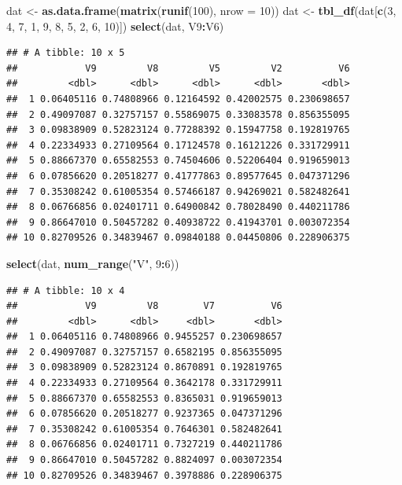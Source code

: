 \documentclass[]{book}
\newenvironment{Shaded}{\begin{snugshade}}{\end{snugshade}}
\newcommand{\KeywordTok}[1]{\textcolor[rgb]{0.13,0.29,0.53}{\textbf{#1}}}
\newcommand{\DataTypeTok}[1]{\textcolor[rgb]{0.13,0.29,0.53}{#1}}
\newcommand{\DecValTok}[1]{\textcolor[rgb]{0.00,0.00,0.81}{#1}}
\newcommand{\StringTok}[1]{\textcolor[rgb]{0.31,0.60,0.02}{#1}}
\newcommand{\OperatorTok}[1]{\textcolor[rgb]{0.81,0.36,0.00}{\textbf{#1}}}
\newcommand{\NormalTok}[1]{#1}
\begin{document}
\begin{Shaded}
\begin{Highlighting}[]
\NormalTok{dat <-}\StringTok{ }\KeywordTok{as.data.frame}\NormalTok{(}\KeywordTok{matrix}\NormalTok{(}\KeywordTok{runif}\NormalTok{(}\DecValTok{100}\NormalTok{), }\DataTypeTok{nrow =} \DecValTok{10}\NormalTok{))}
\NormalTok{dat <-}\StringTok{ }\KeywordTok{tbl_df}\NormalTok{(dat[}\KeywordTok{c}\NormalTok{(}\DecValTok{3}\NormalTok{, }\DecValTok{4}\NormalTok{, }\DecValTok{7}\NormalTok{, }\DecValTok{1}\NormalTok{, }\DecValTok{9}\NormalTok{, }\DecValTok{8}\NormalTok{, }\DecValTok{5}\NormalTok{, }\DecValTok{2}\NormalTok{, }\DecValTok{6}\NormalTok{, }\DecValTok{10}\NormalTok{)])}
\KeywordTok{select}\NormalTok{(dat, V9}\OperatorTok{:}\NormalTok{V6)}
\end{Highlighting}
\end{Shaded}

\begin{verbatim}
## # A tibble: 10 x 5
##            V9         V8         V5         V2          V6
##         <dbl>      <dbl>      <dbl>      <dbl>       <dbl>
##  1 0.06405116 0.74808966 0.12164592 0.42002575 0.230698657
##  2 0.49097087 0.32757157 0.55869075 0.33083578 0.856355095
##  3 0.09838909 0.52823124 0.77288392 0.15947758 0.192819765
##  4 0.22334933 0.27109564 0.17124578 0.16121226 0.331729911
##  5 0.88667370 0.65582553 0.74504606 0.52206404 0.919659013
##  6 0.07856620 0.20518277 0.41777863 0.89577645 0.047371296
##  7 0.35308242 0.61005354 0.57466187 0.94269021 0.582482641
##  8 0.06766856 0.02401711 0.64900842 0.78028490 0.440211786
##  9 0.86647010 0.50457282 0.40938722 0.41943701 0.003072354
## 10 0.82709526 0.34839467 0.09840188 0.04450806 0.228906375
\end{verbatim}

\begin{Shaded}
\begin{Highlighting}[]
\KeywordTok{select}\NormalTok{(dat, }\KeywordTok{num_range}\NormalTok{(}\StringTok{"V"}\NormalTok{, }\DecValTok{9}\OperatorTok{:}\DecValTok{6}\NormalTok{))}
\end{Highlighting}
\end{Shaded}

\begin{verbatim}
## # A tibble: 10 x 4
##            V9         V8        V7          V6
##         <dbl>      <dbl>     <dbl>       <dbl>
##  1 0.06405116 0.74808966 0.9455257 0.230698657
##  2 0.49097087 0.32757157 0.6582195 0.856355095
##  3 0.09838909 0.52823124 0.8670891 0.192819765
##  4 0.22334933 0.27109564 0.3642178 0.331729911
##  5 0.88667370 0.65582553 0.8365031 0.919659013
##  6 0.07856620 0.20518277 0.9237365 0.047371296
##  7 0.35308242 0.61005354 0.7646301 0.582482641
##  8 0.06766856 0.02401711 0.7327219 0.440211786
##  9 0.86647010 0.50457282 0.8824097 0.003072354
## 10 0.82709526 0.34839467 0.3978886 0.228906375
\end{verbatim}
\end{document}
